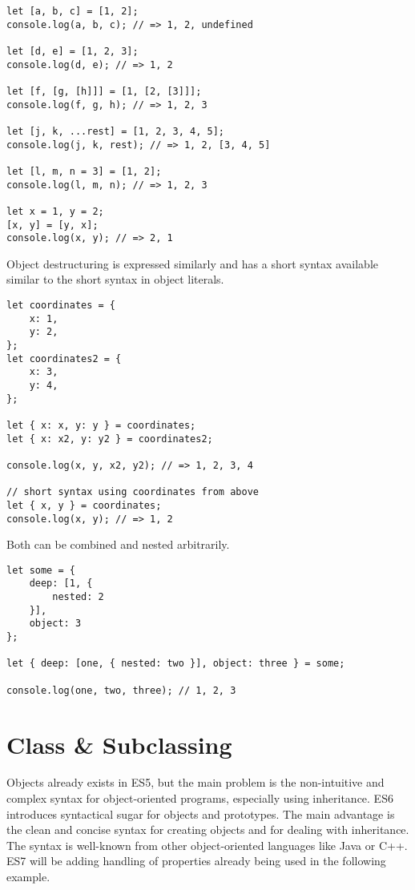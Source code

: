 \documentclass{bioinfo}
\begin{document}
\begin{lstlisting}
let [a, b, c] = [1, 2];
console.log(a, b, c); // => 1, 2, undefined

let [d, e] = [1, 2, 3];
console.log(d, e); // => 1, 2

let [f, [g, [h]]] = [1, [2, [3]]];
console.log(f, g, h); // => 1, 2, 3

let [j, k, ...rest] = [1, 2, 3, 4, 5];
console.log(j, k, rest); // => 1, 2, [3, 4, 5]

let [l, m, n = 3] = [1, 2];
console.log(l, m, n); // => 1, 2, 3

let x = 1, y = 2;
[x, y] = [y, x];
console.log(x, y); // => 2, 1
\end{lstlisting}

Object destructuring is expressed similarly and has a short syntax available
similar to the short syntax in object literals.
\begin{lstlisting}
let coordinates = {
    x: 1,
    y: 2,
};
let coordinates2 = {
    x: 3,
    y: 4,
};

let { x: x, y: y } = coordinates;
let { x: x2, y: y2 } = coordinates2;

console.log(x, y, x2, y2); // => 1, 2, 3, 4

// short syntax using coordinates from above
let { x, y } = coordinates;
console.log(x, y); // => 1, 2
\end{lstlisting}

Both can be combined and nested arbitrarily.

\begin{lstlisting}
let some = {
    deep: [1, {
        nested: 2
    }],
    object: 3
};

let { deep: [one, { nested: two }], object: three } = some;

console.log(one, two, three); // 1, 2, 3
\end{lstlisting}

\section{Class \& Subclassing}
Objects already exists in ES5, but the main problem is the non-intuitive and complex
syntax for object-oriented programs, especially using inheritance. ES6 introduces
syntactical sugar for objects and prototypes. The main advantage is the clean
and concise syntax for creating objects and for dealing with inheritance.
The syntax is well-known from other object-oriented languages like Java or C++.
ES7 will be adding handling of properties already being used in the following example.
\end{document}
